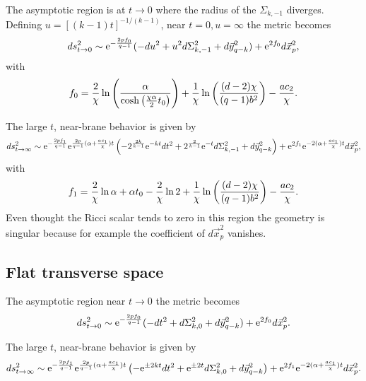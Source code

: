 \documentclass[a4paper,aps,nofootinbib,showpacs,preprint]{revtex4}
\begin{document}
The asymptotic region is at $t\to 0$ where the radius of the
$\Sigma_{k,-1}$ diverges. Defining $u=[(k-1)t]^{-1/(k-1)}$, near
$t=0, u=\infty$ the metric becomes
\begin{equation}
ds^2_{t\to 0} \sim {\rm e}^{-\frac{2p f_0}{q-1}} ( - du^2 + u^2
d\Sigma_{k,-1}^2 + d\vec y_{q-k}^2 ) + {\rm e}^{2f_0} d\vec x_p^2,
\end{equation}
with
\begin{equation}
f_0 = \frac2{\chi} \ln \left( \frac{\alpha}{\cosh \left( {\chi
\alpha \over 2} t_0 \right)} \right) + \frac1{\chi} \ln \left( {
(d-2) \chi \over (q-1) b^2 } \right) - {a c_2\over \chi}.
\end{equation}

The large $t$, near-brane behavior is given by
\begin{equation}
ds^2_{t\to \infty} \sim {\rm e}^{-\frac{2pf_1}{q-1}} {\rm
e}^{\frac{2p}{q-1}(\alpha+\frac{ac_1}{\chi})t} \left( -
2^{\frac{2k}{k-1}} {\rm e}^{-kt} dt^2 + 2^{\frac2{k-1}} {\rm
e}^{-t} d\Sigma_{k,-1}^2 + d\vec y_{q-k}^2 \right) + {\rm
e}^{2f_1} {\rm e}^{-2(\alpha+\frac{ac_1}{\chi})t} d\vec x_p^2,
\end{equation}
with
\begin{equation}
f_1 = \frac2{\chi} \ln \alpha + \alpha t_0 - \frac2{\chi} \ln 2 +
\frac1{\chi} \ln \left( { (d-2) \chi \over (q-1) b^2 } \right) -
{a c_2\over \chi}.
\end{equation}
Even thought the Ricci scalar tends to zero in this region the
geometry is singular because for example the coefficient of
$d\vec x_{p}^2$ vanishes.


\subsection{Flat transverse space}
The asymptotic region near $t \to 0$ the metric becomes
\begin{equation}
ds^2_{t\to 0} \sim {\rm e}^{-\frac{2p f_0}{q-1}} ( - dt^2 +
d\Sigma_{k,0}^2 + d\vec y_{q-k}^2 ) + {\rm e}^{2f_0} d\vec x_p^2.
\end{equation}

The large $t$, near-brane behavior is given by
\begin{equation}
ds^2_{t\to \infty} \sim {\rm e}^{-\frac{2pf_1}{q-1}} {\rm
e}^{\frac{2p}{q-1}(\alpha+\frac{ac_1}{\chi})t} \left( - {\rm
e}^{\pm 2kt} dt^2 + {\rm e}^{\pm 2t} d\Sigma_{k,0}^2 + d\vec
y_{q-k}^2 \right) + {\rm e}^{2f_1} {\rm
e}^{-2(\alpha+\frac{ac_1}{\chi})t} d\vec x_p^2.
\end{equation}
\end{document}

